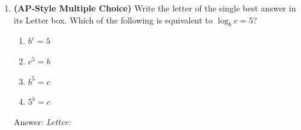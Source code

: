 \documentclass[10pt]{article}
\begin{document}
\begin{enumerate}[itemsep=14pt]
      \vspace{0.06in}
      $I / I_0 = $ \smash{\gradedblank[id=hw5a, type=short, points=1, answer={10^{7}}]{3cm}{13pt}} \qquad $\log_{10}(I / I_0) = $ \smash{\gradedblank[id=hw5b, type=short, points=1, answer={7}]{3cm}{13pt}} \qquad $L = $ \smash{\gradedblank[id=hw5c, type=short, points=1, display={70 dB}, answer={70}]{3cm}{13pt}}

\item \textbf{(AP-Style Multiple Choice)} Write the letter of the single best answer in its Letter box. Which of the following is equivalent to $\log_b c = 5$?

      \medskip
      \begin{enumerate}[label=(\Alph*), itemsep=4pt]
        \item $b^c = 5$
        \item $c^5 = b$
        \item $b^5 = c$
        \item $5^b = c$
      \end{enumerate}

      \vspace{0.04in}
      Answer: \textit{Letter:}~\gradedblank[id=hw6, type=choice, points=1, answer=C]{1.5cm}{13pt}

\end{enumerate}
\end{document}
